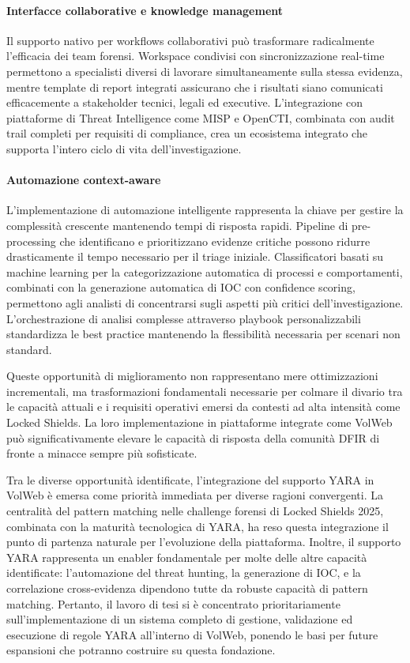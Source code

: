 \paragraph{Interfacce collaborative e knowledge management}
Il supporto nativo per workflows collaborativi può trasformare radicalmente l'efficacia dei team forensi. Workspace condivisi con sincronizzazione real-time permettono a specialisti diversi di lavorare simultaneamente sulla stessa evidenza, mentre template di report integrati assicurano che i risultati siano comunicati efficacemente a stakeholder tecnici, legali ed executive. L'integrazione con piattaforme di Threat Intelligence come MISP e OpenCTI, combinata con audit trail completi per requisiti di compliance, crea un ecosistema integrato che supporta l'intero ciclo di vita dell'investigazione.

\paragraph{Automazione context-aware}
L'implementazione di automazione intelligente rappresenta la chiave per gestire la complessità crescente mantenendo tempi di risposta rapidi. Pipeline di pre-processing che identificano e prioritizzano evidenze critiche possono ridurre drasticamente il tempo necessario per il triage iniziale. Classificatori basati su machine learning per la categorizzazione automatica di processi e comportamenti, combinati con la generazione automatica di IOC con confidence scoring, permettono agli analisti di concentrarsi sugli aspetti più critici dell'investigazione. L'orchestrazione di analisi complesse attraverso playbook personalizzabili standardizza le best practice mantenendo la flessibilità necessaria per scenari non standard.

Queste opportunità di miglioramento non rappresentano mere ottimizzazioni incrementali, ma trasformazioni fondamentali necessarie per colmare il divario tra le capacità attuali e i requisiti operativi emersi da contesti ad alta intensità come Locked Shields. La loro implementazione in piattaforme integrate come VolWeb può significativamente elevare le capacità di risposta della comunità DFIR di fronte a minacce sempre più sofisticate.

Tra le diverse opportunità identificate, l'integrazione del supporto YARA in VolWeb è emersa come priorità immediata per diverse ragioni convergenti. La centralità del pattern matching nelle challenge forensi di Locked Shields 2025, combinata con la maturità tecnologica di YARA, ha reso questa integrazione il punto di partenza naturale per l'evoluzione della piattaforma. Inoltre, il supporto YARA rappresenta un enabler fondamentale per molte delle altre capacità identificate: l'automazione del threat hunting, la generazione di IOC, e la correlazione cross-evidenza dipendono tutte da robuste capacità di pattern matching. Pertanto, il lavoro di tesi si è concentrato prioritariamente sull'implementazione di un sistema completo di gestione, validazione ed esecuzione di regole YARA all'interno di VolWeb, ponendo le basi per future espansioni che potranno costruire su questa fondazione.